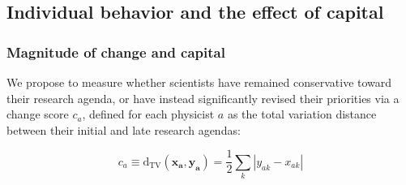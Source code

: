 \documentclass{article}
\begin{document}



\subsection{\label{sec:magnitude}Individual behavior and the effect of capital}

\subsubsection{Magnitude of change and capital}

We propose to measure whether scientists have remained conservative toward their research agenda, or have instead significantly revised their priorities via a change score $c_a$, defined for each physicist $a$ as the total variation distance between their initial and late research agendas:

\begin{equation}
    c_a \equiv \mathrm{d}_{\text{TV}}(\bm{x_a},\bm{y_a}) = \frac{1}{2} \sum_k |y_{ak}-x_{ak}|
\end{equation}
\end{document}
